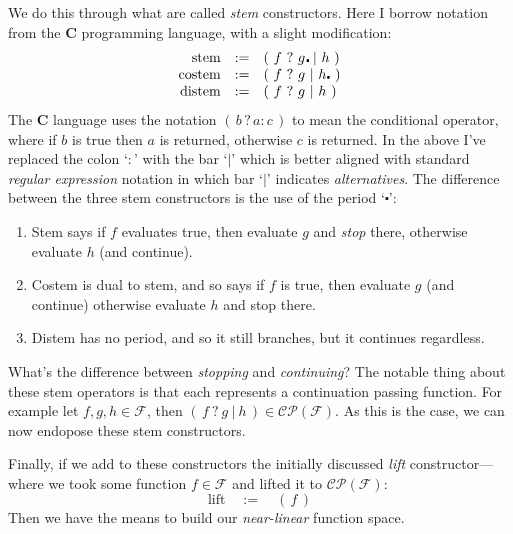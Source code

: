 \documentclass[twoside]{article}
\newcommand{\qdefeq}{\ensuremath{\quad :=\quad}}
\newcommand{\strong}[1]{{\bfseries #1}}
\newcommand{\lift}{\mbox{lift}}
\newcommand{\stem}{\mbox{stem}}
\newcommand{\costem}{\mbox{costem}}
\newcommand{\distem}{\mbox{distem}}
\begin{document}
\begin{minipage}{12cm}
We do this through what are called \emph{stem} constructors. Here I borrow
notation from the \strong{C} programming language, with a slight modification:
$$ \def\arraystretch{1}
\begin{array}{rclcl}
\stem		& := & (\ f\ ?\ g\!\centerdot |\ h\           )		\\
\costem		& := & (\ f\ ?\ g\            |\ h\centerdot\ )		\\
\distem		& := & (\ f\ ?\ g\            |\ h\           )
\end{array} $$
The \strong{C} language uses the notation $ (\,b\,?\,a:c\,) $ to mean the conditional operator, where if $ b $ is true
then $ a $ is returned, otherwise $ c $ is returned. In the above I've replaced the colon `$ : $' with the bar `$ | $' which
is better aligned with standard \emph{regular expression} notation in which bar `$ | $' indicates \emph{alternatives}.
The difference between the three stem constructors is the use of the period `$ \centerdot $':
\begin{enumerate}
\item Stem says if $ f $ evaluates true, then evaluate $ g $ and \emph{stop} there,
	otherwise evaluate $ h $ (and continue).
\item Costem is dual to stem, and so says if $ f $ is true, then evaluate $ g $ (and continue)
	 otherwise evaluate $ h $ and stop there.
\item Distem has no period, and so it still branches, but it continues regardless.
\end{enumerate}
What's the difference between \emph{stopping} and \emph{continuing}? The notable thing about these stem operators
is that each represents a continuation passing function. For example let $ f,g,h\in\mathcal{F} $, then
$ (\,f\ ?\ g\ |\ h\,)\in\mathcal{CP(F)} $. As this is the case, we can now endopose these stem constructors.


\end{minipage}\newpage\begin{minipage}{12cm}


Finally, if we add to these constructors the initially discussed \emph{lift} constructor---where we took some function
$ f\in\mathcal{F} $ and lifted it to $ \mathcal{CP(F)} $:\\[-1ex]
$$ \lift \qdefeq (\,f\,) $$
Then we have the means to build our \emph{near-linear} function space.


\end{minipage}
\end{document}
